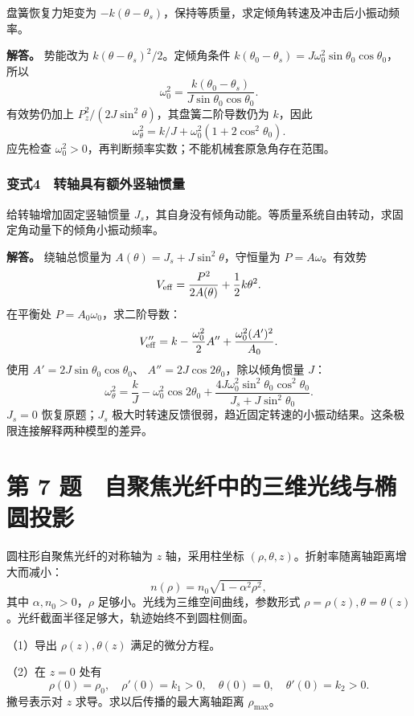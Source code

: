 \documentclass[12pt,a4paper,fontset=fandol]{ctexart}
\begin{document}
盘簧恢复力矩变为
\(-k(\theta-\theta_s)\)，保持等质量，求定倾角转速及冲击后小振动频率。

\textbf{解答。} 势能改为 \(k(\theta-\theta_s)^2/2\)。定倾角条件
\(k(\theta_0-\theta_s)=J\omega_0^2\sin\theta_0\cos\theta_0\)， 所以 \[
\omega_0^2=\frac{k(\theta_0-\theta_s)}
{J\sin\theta_0\cos\theta_0}.
\] 有效势仍加上 \(P_z^2/(2J\sin^2\theta)\)，其盘簧二阶导数仍为
\(k\)，因此 \[
\boxed{\omega_\theta^2=k/J+\omega_0^2(1+2\cos^2\theta_0).}
\] 应先检查 \(\omega_0^2>0\)，再判断频率实数；不能机械套原急角存在范围。

\subsubsection{变式4　转轴具有额外竖轴惯量}\label{ux53d8ux5f0f4-ux8f6cux8f74ux5177ux6709ux989dux5916ux7ad6ux8f74ux60efux91cf}

给转轴增加固定竖轴惯量
\(J_s\)，其自身没有倾角动能。等质量系统自由转动，求固定角动量下的倾角小振动频率。

\textbf{解答。} 绕轴总惯量为 \(A(\theta)=J_s+J\sin^2\theta\)，守恒量为
\(P=A\omega\)。有效势 \[
V_{\rm eff}=\frac{P^2}{2A(\theta)}+\frac12k\theta^2.
\] 在平衡处 \(P=A_0\omega_0\)，求二阶导数： \[
V_{\rm eff}''
=k-\frac{\omega_0^2}{2}A''+
\frac{\omega_0^2(A')^2}{A_0}.
\] 使用 \(A'=2J\sin\theta_0\cos\theta_0\)、
\(A''=2J\cos2\theta_0\)，除以倾角惯量 \(J\)： \[
\boxed{\omega_\theta^2=
\frac{k}{J}-\omega_0^2\cos2\theta_0+
\frac{4J\omega_0^2\sin^2\theta_0\cos^2\theta_0}
{J_s+J\sin^2\theta_0}.}
\] \(J_s=0\) 恢复原题；\(J_s\)
极大时转速反馈很弱，趋近固定转速的小振动结果。这条极限连接解释两种模型的差异。

\clearpage

\section{第 7
题　自聚焦光纤中的三维光线与椭圆投影}\label{ux7b2c-7-ux9898-ux81eaux805aux7126ux5149ux7ea4ux4e2dux7684ux4e09ux7ef4ux5149ux7ebfux4e0eux692dux5706ux6295ux5f71}

圆柱形自聚焦光纤的对称轴为 \(z\) 轴，采用柱坐标
\((\rho,\theta,z)\)。折射率随离轴距离增大而减小： \[
n(\rho)=n_0\sqrt{1-\alpha^2\rho^2},
\] 其中 \(\alpha,n_0>0\)，\(\rho\) 足够小。光线为三维空间曲线，参数形式
\(\rho=\rho(z),\theta=\theta(z)\)。光纤截面半径足够大，轨迹始终不到圆柱侧面。

（1）导出 \(\rho(z),\theta(z)\) 满足的微分方程。

（2）在 \(z=0\) 处有 \[
\rho(0)=\rho_0,\quad \rho'(0)=k_1>0,\quad
\theta(0)=0,\quad\theta'(0)=k_2>0.
\] 撇号表示对 \(z\) 求导。求以后传播的最大离轴距离 \(\rho_{\max}\)。
\end{document}
